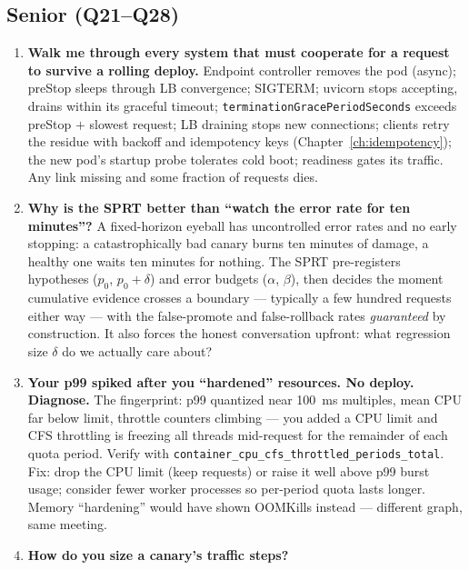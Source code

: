 \subsection*{Senior (Q21--Q28)}
\begin{enumerate}[label=\textbf{Q\arabic*.}, leftmargin=1.6cm, start=21]
  \item \textbf{Walk me through every system that must cooperate for a
        request to survive a rolling deploy.}
        Endpoint controller removes the pod (async); preStop sleeps
        through LB convergence; SIGTERM; uvicorn stops accepting, drains
        within its graceful timeout; \texttt{terminationGracePeriodSeconds}
        exceeds preStop $+$ slowest request; LB draining stops new
        connections; clients retry the residue with backoff and
        idempotency keys (Chapter~\ref{ch:idempotency}); the new pod's
        startup probe tolerates cold boot; readiness gates its traffic.
        Any link missing and some fraction of requests dies.
  \item \textbf{Why is the SPRT better than ``watch the error rate for
        ten minutes''?}
        A fixed-horizon eyeball has uncontrolled error rates and no
        early stopping: a catastrophically bad canary burns ten minutes
        of damage, a healthy one waits ten minutes for nothing. The SPRT
        pre-registers hypotheses ($p_0$, $p_0{+}\delta$) and error
        budgets ($\alpha$, $\beta$), then decides the moment cumulative
        evidence crosses a boundary --- typically a few hundred requests
        either way --- with the false-promote and false-rollback rates
        \emph{guaranteed} by construction. It also forces the honest
        conversation upfront: what regression size $\delta$ do we
        actually care about?
  \item \textbf{Your p99 spiked after you ``hardened'' resources. No
        deploy. Diagnose.}
        The fingerprint: p99 quantized near 100~ms multiples, mean CPU
        far below limit, throttle counters climbing --- you added a CPU
        limit and CFS throttling is freezing all threads mid-request for
        the remainder of each quota period. Verify with
        \texttt{container\_cpu\_cfs\_throttled\_periods\_total}. Fix:
        drop the CPU limit (keep requests) or raise it well above p99
        burst usage; consider fewer worker processes so per-period quota
        lasts longer. Memory ``hardening'' would have shown OOMKills
        instead --- different graph, same meeting.
  \item \textbf{How do you size a canary's traffic steps?}

\end{enumerate}

